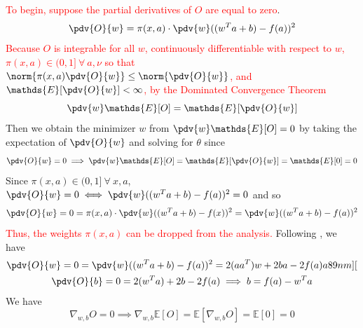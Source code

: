         \textcolor{red}{To begin, suppose the partial derivatives of $O$ are equal to zero}.
        \begin{equation*}
            \pdv{O}{w}=\pi(x,a)\cdot \pdv{w}((w^Ta+b)-f(a))^2
        \end{equation*}
        \textcolor{red}{Because $O$ is integrable for all $w$, continuously differentiable with respect to $w$, $\pi(x,a) \in (0,1]\ \forall\ a,\nu$ so that $\norm{\pi(x,a)\pdv{O}{w}}\leq\norm{\pdv{O}{w}}$, and $\mathds{E}[\pdv{O}{w}]<\infty$, by the Dominated Convergence Theorem}
        \begin{equation*}
            \pdv{w}\mathds{E}[O] = \mathds{E}[\pdv{O}{w}]
        \end{equation*}
        Then we obtain the minimizer $w$ from $\pdv{w}\mathds{E}[O]=0$ by taking the expectation of $\pdv{O}{w}$ and solving for $\theta$ since 
        \begin{equation*}
            \pdv{O}{w} = 0 \implies \pdv{w}\mathds{E}[O] = \mathds{E}[\pdv{O}{w}] = \mathds{E}[0] = 0 
        \end{equation*}
        Since $\pi(x,a)\in(0,1]\ \forall\ x,a$, $\pdv{O}{w} = 0 \iff \pdv{w}((w^Ta+b)-f(a))^2=0$ and so
        \begin{equation*}
            \pdv{O}{w} = 0 = \pi(x,a)\cdot \pdv{w}((w^Ta+b)-f(x))^2 = \pdv{w}((w^Ta+b)-f(a))^2
        \end{equation*}
        \textcolor{red}{Thus, the weights $\pi(x,a)$ can be dropped from the analysis.} Following \citep{agarwal21clime}, we have 
        \begin{gather}
            \pdv{O}{w} = 0 = \pdv{w}((w^Ta+b)-f(a))^2 = 2(aa^T)w + 2ba - 2f(a)a
            89nm
            ][\\
            \pdv{O}{b} = 0 = 2(w^Ta) + 2b - 2f(a) \implies b = f(a) - w^Ta
        \end{gather}
        We have 
        \begin{equation*}
            \nabla_{w,b} O = 0 \implies \nabla_{w,b} \mathds{E}[O] = \mathds{E}[\nabla_{w,b}O] = \mathds{E}[0]=0
        \end{equation*}
